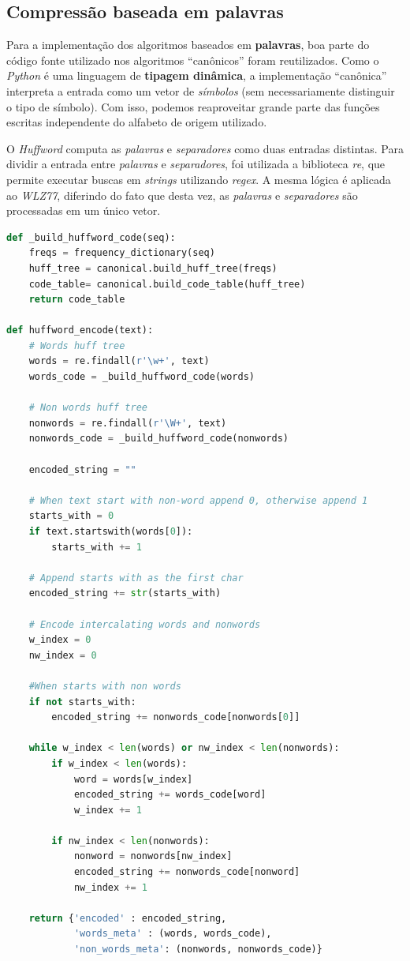 \subsection{Compressão baseada em palavras}
Para a implementação dos algoritmos baseados em \textbf{palavras}, boa parte do código fonte utilizado nos algoritmos ``canônicos'' foram reutilizados.
Como o \emph{Python} é uma linguagem de \textbf{tipagem dinâmica}, a implementação ``canônica'' interpreta a entrada como um vetor de \emph{símbolos} (sem necessariamente distinguir o tipo de símbolo).
Com isso, podemos reaproveitar grande parte das funções escritas independente do alfabeto de origem utilizado. 

O \emph{Huffword} computa as \emph{palavras} e \emph{separadores} como duas entradas distintas.
Para dividir a entrada entre \emph{palavras} e \emph{separadores}, foi utilizada a biblioteca \emph{re}, que permite executar buscas em \emph{strings} utilizando \emph{regex}.
A mesma lógica é aplicada ao \emph{WLZ77}, diferindo do fato que desta vez, as \emph{palavras} e \emph{separadores} são processadas em um único vetor.

\begin{lstlisting}[language=Python, caption=Função \emph{encode} para o \emph{Huffword}]
def _build_huffword_code(seq):
    freqs = frequency_dictionary(seq)
    huff_tree = canonical.build_huff_tree(freqs)
    code_table= canonical.build_code_table(huff_tree)
    return code_table
    
def huffword_encode(text):
    # Words huff tree
    words = re.findall(r'\w+', text)
    words_code = _build_huffword_code(words)

    # Non words huff tree
    nonwords = re.findall(r'\W+', text)
    nonwords_code = _build_huffword_code(nonwords)

    encoded_string = ""

    # When text start with non-word append 0, otherwise append 1
    starts_with = 0
    if text.startswith(words[0]):
        starts_with += 1
    
    # Append starts with as the first char
    encoded_string += str(starts_with)

    # Encode intercalating words and nonwords
    w_index = 0
    nw_index = 0

    #When starts with non words
    if not starts_with:
        encoded_string += nonwords_code[nonwords[0]]
    
    while w_index < len(words) or nw_index < len(nonwords):
        if w_index < len(words):
            word = words[w_index]
            encoded_string += words_code[word]
            w_index += 1
        
        if nw_index < len(nonwords):
            nonword = nonwords[nw_index]
            encoded_string += nonwords_code[nonword]
            nw_index += 1
    
    return {'encoded' : encoded_string,
            'words_meta' : (words, words_code),
            'non_words_meta': (nonwords, nonwords_code)}
\end{lstlisting}



